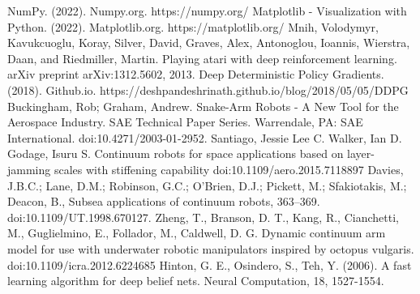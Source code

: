 \documentclass[12pt,twoside,a4]{mwbk}
\begin{document}
\begin{thebibliography}{9}
 NumPy. (2022). Numpy.org. https://numpy.org/
 Matplotlib - Visualization with Python. (2022). Matplotlib.org. https://matplotlib.org/
 Mnih, Volodymyr, Kavukcuoglu, Koray, Silver, David, Graves, Alex, Antonoglou, Ioannis, Wierstra, Daan, and Riedmiller, Martin. Playing atari with deep reinforcement learning. arXiv preprint arXiv:1312.5602, 2013.
 Deep Deterministic Policy Gradients. (2018). Github.io. https://deshpandeshrinath.github.io/blog/2018/05/05/DDPG
 Buckingham, Rob; Graham, Andrew. Snake-Arm Robots - A New Tool for the Aerospace Industry. SAE Technical Paper Series. Warrendale, PA: SAE International. doi:10.4271/2003-01-2952.
 Santiago, Jessie Lee C. Walker, Ian D. Godage, Isuru S. Continuum robots for space applications based on layer-jamming scales with stiffening capability doi:10.1109/aero.2015.7118897
 Davies, J.B.C.; Lane, D.M.; Robinson, G.C.; O'Brien, D.J.; Pickett, M.; Sfakiotakis, M.; Deacon, B., Subsea applications of continuum robots, 363–369. doi:10.1109/UT.1998.670127.
 Zheng, T., Branson, D. T., Kang, R., Cianchetti, M., Guglielmino, E., Follador, M., Caldwell, D. G. Dynamic continuum arm model for use with underwater robotic manipulators inspired by octopus vulgaris. doi:10.1109/icra.2012.6224685
 Hinton, G. E., Osindero, S., Teh, Y. (2006). A fast learning algorithm for deep belief nets. Neural Computation, 18, 1527-1554.
\end{thebibliography}
\end{document}

